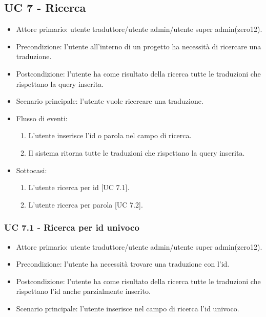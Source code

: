 \subsection{UC 7 - Ricerca}
    \begin{itemize}
        \item Attore primario: utente traduttore/utente admin/utente super admin(zero12).
        \item Precondizione: l'utente all'interno di un progetto ha necessità di ricercare una traduzione.
        \item Postcondizione: l'utente ha come risultato della ricerca tutte le traduzioni che rispettano la query inserita.
        \item Scenario principale: l'utente vuole ricercare una traduzione.
        \item Flusso di eventi:
            \begin{enumerate}
                \item L'utente inserisce l'id o parola nel campo di ricerca.
                \item Il sistema ritorna tutte le traduzioni che rispettano la query inserita.
            \end{enumerate}
        \item Sottocasi:
                \begin{enumerate}
                    \item L'utente ricerca per id [UC 7.1].
                    \item L'utente ricerca per parola [UC 7.2].
                \end{enumerate}
    \end{itemize}
    \subsubsection{UC 7.1 - Ricerca per id univoco}%
        \begin{itemize}
            \item Attore primario: utente traduttore/utente admin/utente super admin(zero12).
            \item Precondizione: l'utente ha necessità trovare una traduzione con l'id.
            \item Postcondizione: l'utente ha come risultato della ricerca tutte le traduzioni che rispettano l'id anche parzialmente inserito.%
            \item Scenario principale: l'utente inserisce nel campo di ricerca l'id univoco.
        \end{itemize}
